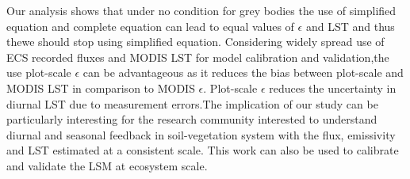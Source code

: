 \documentclass[fleqn,10pt]{wlscirep}
\begin{document}
{Our analysis shows that under no condition for grey bodies the use of simplified equation and complete equation can lead to equal values of $\epsilon$ and LST and thus thewe should stop using simplified equation. Considering widely spread use of ECS recorded fluxes and MODIS LST for model calibration and validation,the use plot-scale $\epsilon$ can be advantageous as it reduces the bias between plot-scale and  MODIS LST in comparison to MODIS $\epsilon$. Plot-scale $\epsilon$ reduces the uncertainty in diurnal LST due to measurement errors.The implication of our study can be particularly interesting for the research community interested to understand diurnal and seasonal feedback in soil-vegetation system with the flux, emissivity and LST estimated at a consistent scale. This work can also be used to calibrate and validate the LSM at ecosystem scale.


}
\end{document}

